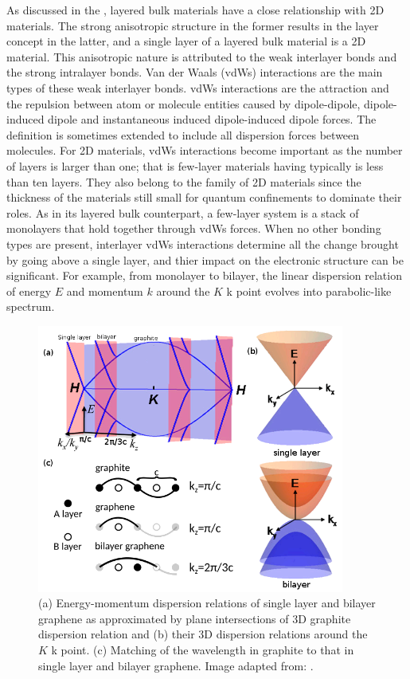 As discussed in the , layered bulk materials have a close relationship with 2D materials. The strong anisotropic structure in the former results in the layer concept in the latter, and a single layer of a layered bulk material is a 2D material. This anisotropic nature is attributed to the weak interlayer bonds and the strong intralayer bonds. Van der Waals (vdWs) interactions \cite{vdws} are the main types of these weak interlayer bonds. vdWs interactions are the attraction and the repulsion between atom or molecule entities caused by dipole-dipole, dipole-induced dipole and instantaneous induced dipole-induced dipole forces. The definition is sometimes extended to include all dispersion forces between molecules.  For 2D materials, vdWs interactions become important as the number of layers is larger than one; that is few-layer materials having typically is less than ten layers. They also belong to the family of 2D materials since the thickness of the materials still small for quantum confinements to dominate their roles. As in its layered bulk counterpart, a few-layer system is a stack of monolayers that hold together through vdWs forces. When no other bonding types are present, interlayer vdWs interactions determine all the change brought by going above a single layer, and thier impact on the electronic structure can be significant. For example, from monolayer to bilayer, the linear dispersion relation of energy $E$ and momentum $k$ around the $K$ k point evolves into parabolic-like spectrum\cite{Partoens2006,Mak2010}. 

\begin{figure}[htbp!] 
\centering  
\includegraphics[width=0.9\textwidth]{gra_band.png}
\caption{(a) Energy-momentum dispersion relations of single layer and bilayer graphene as approximated by plane intersections of 3D graphite dispersion relation and (b) their 3D dispersion relations around the $K$ k point. (c) Matching of the wavelength in graphite to that in single layer and bilayer graphene. Image adapted from: \cite{Mak2010}. }  
\label{fig:gra_bands}
\end{figure} 

